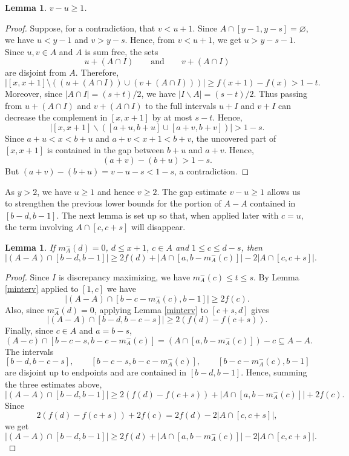 \documentclass[11pt,reqno]{amsart}
\newtheorem{lem}[thm]{Lemma}
\theoremstyle{definition}
\def\F#1{f(#1)}
\begin{document}
\begin{lem} \label{y - 1 gap lem}
    $v - u \geq 1$. 
\end{lem}
\begin{proof}
    Suppose, for a contradiction, that $v<u+1$. Since
$A\cap[y-1,y-s]=\varnothing$, we have $u<y-1$ and $v>y-s$.
Hence, from $v<u+1$, we get
$ u>y-s-1$.
Since $u,v\in A$ and $A$ is sum free, the sets
$$
u+(A\cap I)
\qquad\text{and}\qquad
v+(A\cap I)
$$
are disjoint from $A$. Therefore,
$$
\big|[x,x+1]\setminus ((u+(A\cap I))\cup (v+(A\cap I)))\big|
\geq \F{x+1}-\F{x}>1-t.
$$
Moreover, since $|A\cap I|=(s+t)/2$, we have $|I\backslash A|=(s-t)/2$. Thus passing from $u+(A\cap I)$ and $v+(A\cap I)$ to the full intervals $u+I$ and $v+I$ can decrease the complement in $[x,x+1]$ by at most $s-t$.
   Hence,  
    \begin{equation*}
        |[x, x + 1]\backslash([a + u, b + u]\cup [a + v, b + v])| > 1 - s. 
    \end{equation*}
 Since $a+u<x<b+u$ and $a+v<x+1<b+v$, the uncovered part of $[x,x+1]$ is contained in the gap between $b+u$ and $a+v$. Hence,  
$$
    (a+v)-(b+u)>1-s.
$$
But $(a+v)-(b+u)=v-u-s<1-s$, a contradiction.
\end{proof}
As $y > 2$, we have $u\geq 1$ and hence $v\geq 2$. The gap estimate $v-u\geq 1$ allows us to strengthen the previous lower bounds for the portion of $A-A$ contained in $[b-d,b-1]$. The next lemma is set up so that, when applied later with $c=u$, the term involving $A\cap[c,c+s]$ will disappear. 
\begin{lem} \label{another boost lem}
If $m_A^-(d) = 0$, $d\leq x+1$, $c\in A$ and $1\leq c\leq d - s$, then
$$
|(A - A)\cap [b - d, b - 1]|\geq 2\F{d} + |A\cap [a, b - m_A^-(c)]| - 2|A\cap [c, c + s]|.
$$
\end{lem}

\begin{proof}
Since $I$ is discrepancy maximizing, we have $m_A^-(c)\leq t\leq s$. By Lemma \ref{minterv} applied to $[1,c]$ we have
$$
|(A - A)\cap [b - c - m_A^-(c), b - 1]|\geq 2\F{c}.
$$
Also, since $m_A^-(d)=0$, applying Lemma \ref{minterv} to $[c+s,d]$ gives
$$
|(A - A)\cap [b - d, b - c - s]|\geq 2(\F{d} - \F{c+s}).
$$
Finally, since $c\in A$ and $a=b-s$,
$$
(A-c)\cap [b-c-s,b-c-m_A^-(c)]
=
(A\cap [a,b-m_A^-(c)])-c
\subseteq A-A.
$$
The intervals
$$
[b-d,b-c-s],\qquad [b-c-s,b-c-m_A^-(c)],\qquad [b-c-m_A^-(c),b-1]
$$
are disjoint up to endpoints and are contained in $[b-d,b-1]$. 
Hence, summing the three estimates above,
$$
|(A - A)\cap [b - d, b - 1]|
\geq
2(\F{d}-\F{c+s})+|A\cap [a,b-m_A^-(c)]|+2\F{c}.
$$
Since
$$
2(\F{d}-\F{c+s})+2\F{c}
=
2\F{d}-2|A\cap[c,c+s]|,
$$
we get
$$
|(A - A)\cap [b - d, b - 1]|
\geq
2\F{d}+|A\cap [a,b-m_A^-(c)]|-2|A\cap[c,c+s]|.
$$
\end{proof}
\end{document}
